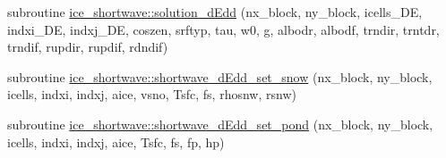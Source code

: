 \begin{DoxyCompactItemize}
\item 
subroutine \hyperlink{namespaceice__shortwave_a35b4eec6be9c5bc0bdb6a520b9f287d8}{ice\_\-shortwave::solution\_\-dEdd} (nx\_\-block, ny\_\-block, icells\_\-DE, indxi\_\-DE, indxj\_\-DE, coszen, srftyp, tau, w0, g, albodr, albodf, trndir, trntdr, trndif, rupdir, rupdif, rdndif)
\item 
subroutine \hyperlink{namespaceice__shortwave_a6cfca7557b0dd2a30e5570b0c0d5ef36}{ice\_\-shortwave::shortwave\_\-dEdd\_\-set\_\-snow} (nx\_\-block, ny\_\-block, icells, indxi, indxj, aice, vsno, Tsfc, fs, rhosnw, rsnw)
\item 
subroutine \hyperlink{namespaceice__shortwave_a09f51c7b0e45e37eeba70b3332d60750}{ice\_\-shortwave::shortwave\_\-dEdd\_\-set\_\-pond} (nx\_\-block, ny\_\-block, icells, indxi, indxj, aice, Tsfc, fs, fp, hp)
\end{DoxyCompactItemize}
